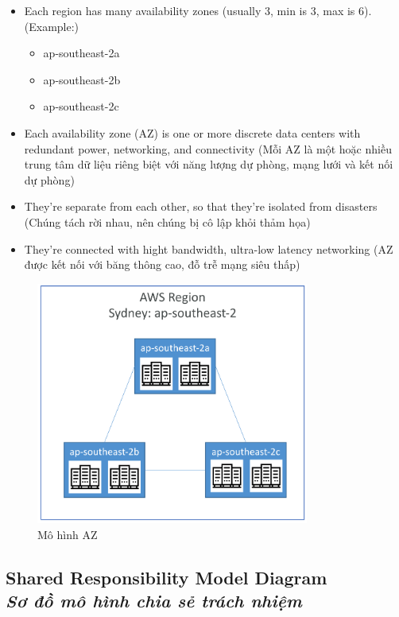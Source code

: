 	\begin{itemize}
		\item Each region has many availability zones (usually 3, min is 3, max is 6). (Example:)
		\begin{itemize}
			\item ap-southeast-2a
			\item ap-southeast-2b
			\item ap-southeast-2c
		\end{itemize}
			\item Each availability zone (AZ) is one or more discrete data centers with redundant power, networking, and connectivity (Mỗi AZ là một hoặc nhiều trung tâm dữ liệu riêng biệt với năng lượng dự phòng, mạng lưới và kết nối dự phòng)
			\item They're separate from each other, so that they're isolated from disasters (Chúng tách rời nhau, nên chúng bị cô lập khỏi thảm họa)
			\item They're connected with hight bandwidth, ultra-low latency networking (AZ được kết nối với băng thông cao, đỗ trễ mạng siêu thấp)
	\end{itemize}
	\begin{figure}[htbp]
		\centering
		\includegraphics[width=0.8\textwidth]{images/az}
		\caption{Mô hình AZ}
		\label{fig:}
	\end{figure}

\subsection[Shared Responsibility Model Diagram]{Shared Responsibility Model Diagram \\
	\textit{Sơ đồ mô hình chia sẻ trách nhiệm}}

